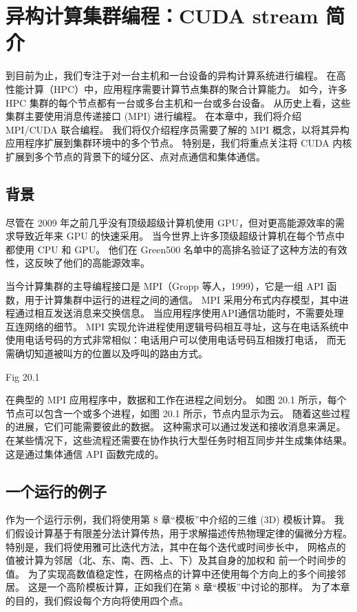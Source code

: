 \section{异构计算集群编程：CUDA stream 简介}
到目前为止，我们专注于对一台主机和一台设备的异构计算系统进行编程。 
在高性能计算（HPC）中，应用程序需要计算节点集群的聚合计算能力。 
如今，许多 HPC 集群的每个节点都有一台或多台主机和一台或多台设备。 
从历史上看，这些集群主要使用消息传递接口 (MPI) 进行编程。 在本章中，我们将介绍 MPI/CUDA 联合编程。 
我们将仅介绍程序员需要了解的 MPI 概念，以将其异构应用程序扩展到集群环境中的多个节点。 
特别是，我们将重点关注将 CUDA 内核扩展到多个节点的背景下的域分区、点对点通信和集体通信。

\subsection{背景}
尽管在 2009 年之前几乎没有顶级超级计算机使用 GPU，但对更高能源效率的需求导致近年来 GPU 的快速采用。 
当今世界上许多顶级超级计算机在每个节点中都使用 CPU 和 GPU。 
他们在 Green500 名单中的高排名验证了这种方法的有效性，这反映了他们的高能源效率。

当今计算集群的主导编程接口是 MPI（Gropp 等人，1999），它是一组 API 函数，用于计算集群中运行的进程之间的通信。 
MPI 采用分布式内存模型，其中进程通过相互发送消息来交换信息。 当应用程序使用API通信功能时，不需要处理互连网络的细节。 
MPI 实现允许进程使用逻辑号码相互寻址，这与在电话系统中使用电话号码的方式非常相似：电话用户可以使用电话号码互相拨打电话，
而无需确切知道被叫方的位置以及呼叫的路由方式。

{\color{red} Fig 20.1}

在典型的 MPI 应用程序中，数据和工作在进程之间划分。 
如图 20.1 所示，每个节点可以包含一个或多个进程，如图 20.1 所示，节点内显示为云。 
随着这些过程的进展，它们可能需要彼此的数据。 这种需求可以通过发送和接收消息来满足。 
在某些情况下，这些流程还需要在协作执行大型任务时相互同步并生成集体结果。 这是通过集体通信 API 函数完成的。

\subsection{一个运行的例子}
作为一个运行示例，我们将使用第 8 章“模板”中介绍的三维 (3D) 模板计算。 
我们假设计算基于有限差分法计算传热，用于求解描述传热物理定律的偏微分方程。 
特别是，我们将使用雅可比迭代方法，其中在每个迭代或时间步长中，
网格点的值被计算为邻居（北、东、南、西、上、下）及其自身的加权和 前一个时间步的值。 
为了实现高数值稳定性，在网格点的计算中还使用每个方向上的多个间接邻居。 
这是一个高阶模板计算，正如我们在第 8 章“模板”中讨论的那样。 为了本章的目的，我们假设每个方向将使用四个点。

